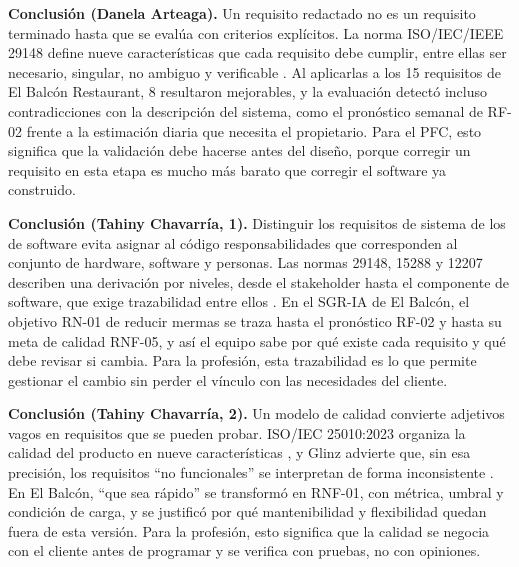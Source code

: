 
\textbf{Conclusión (Danela Arteaga).} Un requisito redactado no es un requisito terminado hasta que se evalúa con criterios explícitos. La norma ISO/IEC/IEEE 29148 define nueve características que cada requisito debe cumplir, entre ellas ser necesario, singular, no ambiguo y verificable \cite[\nopp cl.~5.2.5]{ieee29148}. Al aplicarlas a los 15 requisitos de El Balcón Restaurant, 8 resultaron mejorables, y la evaluación detectó incluso contradicciones con la descripción del sistema, como el pronóstico semanal de RF-02 frente a la estimación diaria que necesita el propietario. Para el PFC, esto significa que la validación debe hacerse antes del diseño, porque corregir un requisito en esta etapa es mucho más barato que corregir el software ya construido.

\textbf{Conclusi\'on (Tahiny Chavarr\'ia, 1).} Distinguir los requisitos de sistema de los de software evita asignar al c\'odigo responsabilidades que corresponden al conjunto de hardware, software y personas. Las normas 29148, 15288 y 12207 describen una derivaci\'on por niveles, desde el stakeholder hasta el componente de software, que exige trazabilidad entre ellos \cite{iso29148,iso15288,ieee12207}. En el SGR-IA de El Balc\'on, el objetivo RN-01 de reducir mermas se traza hasta el pron\'ostico RF-02 y hasta su meta de calidad RNF-05, y as\'i el equipo sabe por qu\'e existe cada requisito y qu\'e debe revisar si cambia. Para la profesi\'on, esta trazabilidad es lo que permite gestionar el cambio sin perder el v\'inculo con las necesidades del cliente.

\textbf{Conclusi\'on (Tahiny Chavarr\'ia, 2).} Un modelo de calidad convierte adjetivos vagos en requisitos que se pueden probar. ISO/IEC 25010:2023 organiza la calidad del producto en nueve caracter\'isticas \cite{iso25010}, y Glinz advierte que, sin esa precisi\'on, los requisitos ``no funcionales'' se interpretan de forma inconsistente \cite{glinz2007}. En El Balc\'on, ``que sea r\'apido'' se transform\'o en RNF-01, con m\'etrica, umbral y condici\'on de carga, y se justific\'o por qu\'e mantenibilidad y flexibilidad quedan fuera de esta versi\'on. Para la profesi\'on, esto significa que la calidad se negocia con el cliente antes de programar y se verifica con pruebas, no con opiniones.


